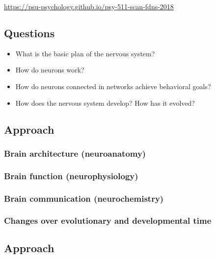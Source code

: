 \documentclass[]{article}
\providecommand{\tightlist}{%
  \setlength{\itemsep}{0pt}\setlength{\parskip}{0pt}}
\begin{document}
\url{https://psu-psychology.github.io/psy-511-scan-fdns-2018}

\subsection{Questions}\label{questions}

\begin{itemize}
\tightlist
\item
  What is the basic plan of the nervous system?
\item
  How do neurons work?
\item
  How do neurons connected in networks achieve behavioral goals?
\item
  How does the nervous system develop? How has it evolved?
\end{itemize}

\subsection{Approach}\label{approach}

\subsubsection{Brain architecture
(neuroanatomy)}\label{brain-architecture-neuroanatomy}

\subsubsection{Brain function
(neurophysiology)}\label{brain-function-neurophysiology}

\subsubsection{Brain communication
(neurochemistry)}\label{brain-communication-neurochemistry}

\subsubsection{Changes over evolutionary and developmental
time}\label{changes-over-evolutionary-and-developmental-time}

\subsection{Approach}\label{approach-1}
\end{document}
